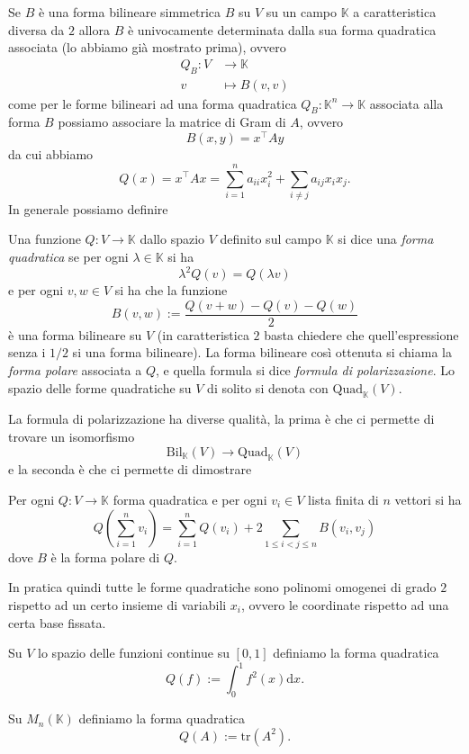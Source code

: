 \documentclass[11pt]{scrartcl}
\newcommand{\dif}{\text{d}}
\newcommand{\tr}[1]{\text{tr}\!\left(#1\right)}
\newcommand{\KK}{\mathbb{K}}
\begin{document}
	Se $B$ è una forma bilineare simmetrica $B$ su $V$ su un campo $\KK$ a caratteristica diversa da $2$ allora $B$ è univocamente determinata dalla sua forma quadratica associata (lo abbiamo già mostrato prima), ovvero
	\begin{align*}
		Q_B:V & \to \KK \\
		v & \mapsto B(v,v)
	\end{align*}
	come per le forme bilineari ad una forma quadratica $Q_B:\KK^n\to\KK$ associata alla forma $B$ possiamo associare la matrice di Gram di $A$, ovvero
	$$B(x,y)=x^\intercal A y$$
	da cui abbiamo
	$$Q(x)=x^\intercal A x = \sum_{i=1}^{n}a_{ii}x_i^2+\sum_{i\ne j}a_{ij}x_ix_j.$$
	In generale possiamo definire 
	\begin{definition}
		Una funzione $Q:V\to \KK$ dallo spazio $V$ definito sul campo $\KK$ si dice una \textit{forma quadratica} se per ogni $\lambda\in \KK$ si ha
		$$\lambda^2 Q(v)=Q(\lambda v)$$
		e per ogni $v,w\in V$ si ha che la funzione
		$$B(v,w):=\frac{Q(v+w)-Q(v)-Q(w)}{2}$$
		è una forma bilineare su $V$ (in caratteristica $2$ basta chiedere che quell'espressione senza i $1/2$ si una forma bilineare). La forma bilineare così ottenuta si chiama la \textit{forma polare} associata a $Q$, e quella formula si dice \textit{formula di polarizzazione}. Lo spazio delle forme quadratiche su $V$ di solito si denota con $\text{Quad}_\KK(V)$.
	\end{definition} 
	La formula di polarizzazione ha diverse qualità, la prima è che ci permette di trovare un isomorfismo 
	$$\text{Bil}_\KK(V)\longrightarrow \text{Quad}_\KK(V)$$
	e la seconda è che ci permette di dimostrare
	\begin{lemma}
		Per ogni $Q:V\to \KK$ forma quadratica e per ogni $v_i\in V$ lista finita di $n$ vettori si ha
		$$Q\left(\sum_{i=1}^{n}v_i\right)=\sum_{i=1}^{n}Q(v_i)+2\sum_{1\le i < j \le n}B(v_i,v_j)$$
		dove $B$ è la forma polare di $Q$.
	\end{lemma}
	In pratica quindi tutte le forme quadratiche sono polinomi omogenei di grado $2$ rispetto ad un certo insieme di variabili $x_i$, ovvero le coordinate rispetto ad una certa base fissata.
	\begin{example}[Norma $L^2$]
		Su $V$ lo spazio delle funzioni continue su $[0,1]$ definiamo la forma quadratica 
		$$Q(f):=\int_0^1 f^2(x)\dif x.$$
	\end{example}
	\begin{example}[Traccia]
		Su $M_n(\KK)$ definiamo la forma quadratica
		$$Q(A):=\tr{A^2}.$$
	\end{example}
\end{document}
